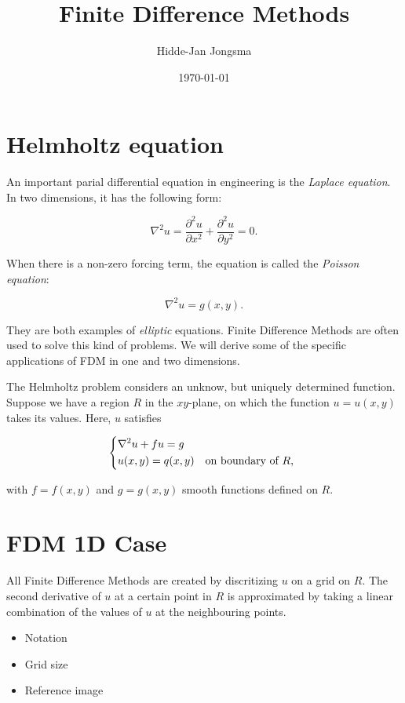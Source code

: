\documentclass[a4paper]{article}
\author{Hidde-Jan Jongsma}
\title{Finite Difference Methods}
\date{\today}
\newcommand{\duxx}{\frac{\partial^2 u}{\partial x^2}}
\newcommand{\duyy}{\frac{\partial^2 u}{\partial y^2}}
\newcommand{\lapu}{\nabla^2 u}
\begin{document}
\section{Helmholtz equation}

An important parial differential equation in engineering is the
\emph{Laplace equation}. In two dimensions, it has the following form:

\begin{equation}
  \lapu = \duxx + \duyy = 0.
\end{equation}

When there is a non-zero forcing term, the equation is called the
\emph{Poisson equation}:

\begin{equation}
  \lapu = g(x, y).
\end{equation}

They are both examples of \emph{elliptic} equations. Finite Difference
Methods are often used to solve this kind of problems. We will derive
some of the specific applications of FDM in one and two dimensions.

The Helmholtz problem considers an unknow, but uniquely determined function.
Suppose we have a region $R$ in the $xy$-plane, on which the function
$u = u(x, y)$ takes its values. Here, $u$ satisfies

\begin{equation}
  \begin{dcases*}
    \lapu + f u = g & \\
    u(x, y) = q(x, y) & on boundary of $R$,
  \end{dcases*}
\end{equation}

with $f = f(x, y)$ and $g = g(x, y)$ smooth functions defined on $R$.

\section{FDM 1D Case}

All Finite Difference Methods are created by discritizing $u$ on a grid
on $R$. The second derivative of $u$ at a certain point in $R$  is
approximated by taking a linear combination of the values of $u$ at
the neighbouring points.

\begin{itemize}
  \item Notation
  \item Grid size
  \item Reference image
\end{itemize}
\end{document}
